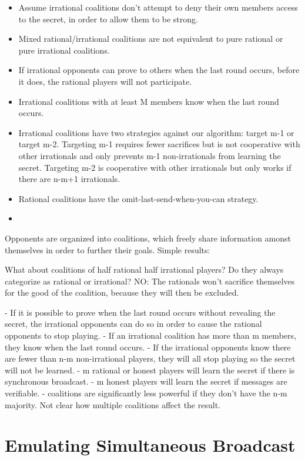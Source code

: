 \documentclass{article}
\begin{document}
\begin{itemize}
  \item Assume irrational coalitions don't attempt to deny their own members access to the secret, in order to allow them to be strong. 
  \item Mixed rational/irrational coalitions are not equivalent to pure rational or pure irrational coalitions.
  \item If irrational opponents can prove to others when the last round occurs, before it does, the rational players will not participate.
  \item Irrational coalitions with at least M members know when the last round occurs.
  \item Irrational coalitions have two strategies against our algorithm: target m-1 or target m-2. Targeting m-1 requires fewer sacrifices but is not cooperative with other irrationals and only prevents m-1 non-irrationals from learning the secret. Targeting m-2 is cooperative with other irrationals but only works if there are n-m+1 irrationals.
  \item Rational coalitions have the omit-last-send-when-you-can strategy.
  \item 
\end{itemize}
Opponents are organized into coalitions, which freely share information amonst themselves in order to further their goals. Simple results:

What about coalitions of half rational half irrational players? Do they always categorize as rational or irrational? NO: The rationals won't sacrifice themselves for the good of the coalition, because they will then be excluded.

- If it is possible to prove when the last round occurs without revealing the secret, the irrational opponents can do so in order to cause the rational opponents to stop playing.
- If an irrational coalition has more than m members, they know when the last round occurs.
- If the irrational opponents know there are fewer than n-m non-irrational players, they will all stop playing so the secret will not be learned.
- m rational or honest players will learn the secret if there is synchronous broadcast.
- m honest players will learn the secret if messages are verifiable.
- coalitions are significantly less powerful if they don't have the n-m majority. Not clear how multiple coalitions affect the result.

\section{Emulating Simultaneous Broadcast}
\end{document}
